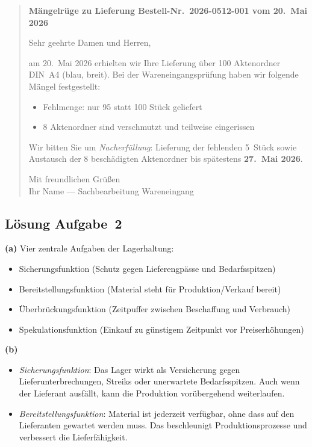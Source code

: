 \documentclass[11pt, a4paper]{article}
\begin{document}
\begin{loesung}
\begin{quote}
\medskip
\textbf{Mängelrüge zu Lieferung Bestell-Nr.\ 2026-0512-001 vom 20.~Mai 2026}

\medskip
Sehr geehrte Damen und Herren,

\medskip
am 20.~Mai 2026 erhielten wir Ihre Lieferung über 100 Aktenordner DIN~A4 (blau, breit).
Bei der Wareneingangsprüfung haben wir folgende Mängel festgestellt:

\begin{itemize}[itemsep=0pt]
  \item Fehlmenge: nur 95 statt 100 Stück geliefert
  \item 8 Aktenordner sind verschmutzt und teilweise eingerissen
\end{itemize}

\medskip
Wir bitten Sie um \emph{Nacherfüllung}: Lieferung der fehlenden 5~Stück sowie
Austausch der 8 beschädigten Aktenordner bis spätestens \textbf{27.~Mai 2026}.

\medskip
Mit freundlichen Grüßen \\
Ihr Name --- Sachbearbeitung Wareneingang
\end{quote}
\end{loesung}

\subsection*{Lösung Aufgabe~2}
\begin{loesung}
\textbf{(a)} Vier zentrale Aufgaben der Lagerhaltung:
\begin{itemize}[itemsep=0pt]
  \item Sicherungsfunktion (Schutz gegen Lieferengpässe und Bedarfsspitzen)
  \item Bereitstellungsfunktion (Material steht für Produktion/Verkauf bereit)
  \item Überbrückungsfunktion (Zeitpuffer zwischen Beschaffung und Verbrauch)
  \item Spekulationsfunktion (Einkauf zu günstigem Zeitpunkt vor Preiserhöhungen)
\end{itemize}

\textbf{(b)}
\begin{itemize}[itemsep=0pt]
  \item \emph{Sicherungsfunktion}: Das Lager wirkt als Versicherung gegen Lieferunterbrechungen, Streiks oder unerwartete Bedarfsspitzen. Auch wenn der Lieferant ausfällt, kann die Produktion vorübergehend weiterlaufen.
  \item \emph{Bereitstellungsfunktion}: Material ist jederzeit verfügbar, ohne dass auf den Lieferanten gewartet werden muss. Das beschleunigt Produktionsprozesse und verbessert die Lieferfähigkeit.
\end{itemize}
\end{loesung}
\end{document}
